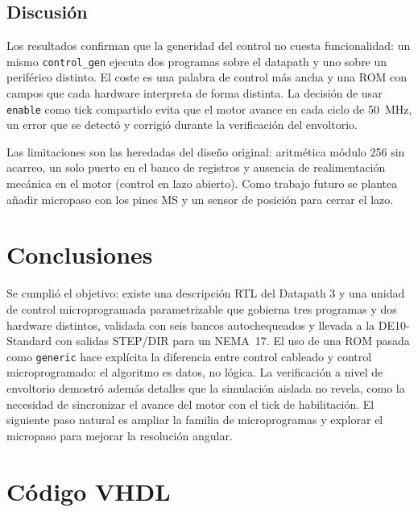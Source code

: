 \documentclass[llncs]{llncs}
\begin{document}
\subsection{Discusión}

Los resultados confirman que la generidad del control no cuesta funcionalidad:
un mismo \texttt{control\_gen} ejecuta dos programas sobre el datapath y uno
sobre un periférico distinto. El coste es una palabra de control más ancha y una
ROM con campos que cada hardware interpreta de forma distinta. La decisión de
usar \texttt{enable} como tick compartido evita que el motor avance en cada
ciclo de 50~MHz, un error que se detectó y corrigió durante la verificación
del envoltorio.

Las limitaciones son las heredadas del diseño original: aritmética módulo 256
sin acarreo, un solo puerto en el banco de registros y ausencia de realimentación
mecánica en el motor (control en lazo abierto). Como trabajo futuro se plantea
añadir micropaso con los pines MS y un sensor de posición para cerrar el lazo.

\section{Conclusiones}
\label{sec:conclusiones}

Se cumplió el objetivo: existe una descripción RTL del Datapath 3 y una unidad
de control microprogramada parametrizable que gobierna tres programas y dos
hardware distintos, validada con seis bancos autochequeados y llevada a la
DE10-Standard con salidas STEP/DIR para un NEMA~17. El uso de una ROM pasada
como \texttt{generic} hace explícita la diferencia entre control cableado y
control microprogramado: el algoritmo es datos, no lógica. La verificación a
nivel de envoltorio demostró además detalles que la simulación aislada no
revela, como la necesidad de sincronizar el avance del motor con el tick de
habilitación. El siguiente paso natural es ampliar la familia de
microprogramas y explorar el micropaso para mejorar la resolución angular.




\appendix
\section{Código VHDL}
\label{app:codigo}
\end{document}

